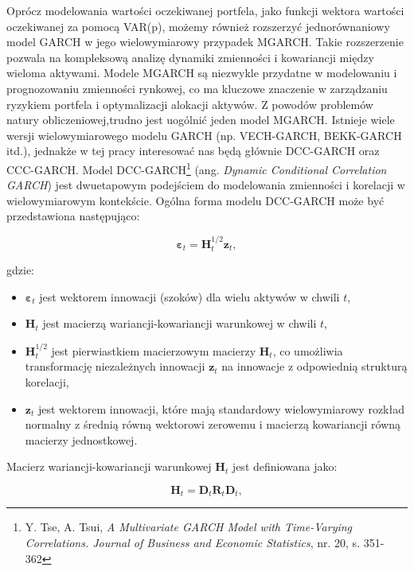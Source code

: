 \begin{enumerate}
Oprócz modelowania wartości oczekiwanej portfela, jako funkcji wektora wartości oczekiwanej za pomocą VAR(p), możemy również rozszerzyć jednorównaniowy model GARCH w jego wielowymiarowy przypadek MGARCH. Takie rozszerzenie pozwala na kompleksową analizę dynamiki zmienności i kowariancji między wieloma aktywami. Modele MGARCH są niezwykle przydatne w modelowaniu i prognozowaniu zmienności rynkowej, co ma kluczowe znaczenie w zarządzaniu ryzykiem portfela i optymalizacji alokacji aktywów. Z powodów problemów natury obliczeniowej,trudno jest uogólnić jeden model MGARCH. Istnieje wiele wersji wielowymiarowego modelu GARCH (np. VECH-GARCH, BEKK-GARCH itd.), jednakże w tej pracy interesować nas będą głównie DCC-GARCH oraz CCC-GARCH. Model DCC-GARCH\footnote{Y. Tse, A. Tsui, \textit{A Multivariate GARCH Model with Time-Varying Correlations. Journal of Business and Economic Statistics}, nr. 20, s. 351-362} (ang. \textit{Dynamic Conditional Correlation GARCH}) jest dwuetapowym podejściem do modelowania zmienności i korelacji w wielowymiarowym kontekście. Ogólna forma modelu DCC-GARCH może być przedstawiona następująco:

\begin{equation}
\boldsymbol{\varepsilon}_t = \mathbf{H}_t^{1/2} \mathbf{z}_t,
\end{equation}

gdzie:
\begin{itemize}
    \item \(\boldsymbol{\varepsilon}_t\) jest wektorem innowacji (szoków) dla wielu aktywów w chwili \(t\),
    \item \(\mathbf{H}_t\) jest macierzą wariancji-kowariancji warunkowej w chwili \(t\),
    \item \(\mathbf{H}_t^{1/2}\) jest pierwiastkiem macierzowym macierzy \(\mathbf{H}_t\), co umożliwia transformację niezależnych innowacji \(\mathbf{z}_t\) na innowacje z odpowiednią strukturą korelacji,
    \item \(\mathbf{z}_t\) jest wektorem innowacji, które mają standardowy wielowymiarowy rozkład normalny z średnią równą wektorowi zerowemu i macierzą kowariancji równą macierzy jednostkowej.
\end{itemize}

Macierz wariancji-kowariancji warunkowej \(\mathbf{H}_t\) jest definiowana jako:

\begin{equation}
\mathbf{H}_t = \mathbf{D}_t \mathbf{R}_t \mathbf{D}_t,
\end{equation}


\end{enumerate}
